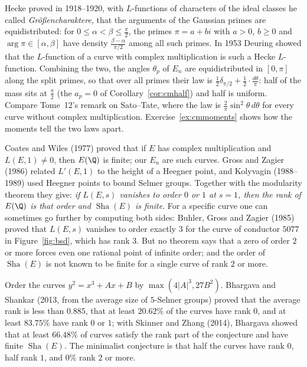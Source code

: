 \begin{remark}\label{rem:hecke}
Hecke proved in 1918--1920, with $L$-functions of characters of the ideal classes he called \emph{Gr\"o\ss encharaktere}, that the arguments of the Gaussian
primes are equidistributed: for $0\le\alpha<\beta\le\frac\pi2$, the primes $\pi=a+bi$ with $a>0$, $b\ge0$ and $\arg\pi\in[\alpha,\beta]$ have density
$\frac{\beta-\alpha}{\pi/2}$ among all such primes. In 1953 Deuring showed that the $L$-function of a curve with complex multiplication is such a Hecke
$L$-function. Combining the two, the angles $\theta_p$ of $E_n$ are equidistributed in $[0,\pi]$ along the split primes, so that over all primes their law is
$\frac12\delta_{\pi/2}+\frac12\cdot\frac{d\theta}\pi$: half of the mass sits at $\frac\pi2$ (the $a_p=0$ of Corollary~\ref{cor:cmhalf}) and half is uniform.
Compare Tome~12's remark on Sato--Tate, where the law is $\frac2\pi\sin^2\theta\,d\theta$ for every curve without complex multiplication.
Exercise~\ref{ex:cmmoments} shows how the moments tell the two laws apart.
\end{remark}

\begin{remark}\label{rem:bsdproved}
Coates and Wiles (1977) proved that if $E$ has complex multiplication and $L(E,1)\ne0$, then $E(\Q)$ is finite; our $E_n$ are such curves. Gross and Zagier
(1986) related $L'(E,1)$ to the height of a Heegner point, and Kolyvagin (1988--1989) used Heegner points to bound Selmer groups. Together with the modularity
theorem they give: \emph{if $L(E,s)$ vanishes to order $0$ or $1$ at $s=1$, then the rank of $E(\Q)$ is that order and $\operatorname{Sha}(E)$ is finite}. For a specific curve
one can sometimes go further by computing both sides: Buhler, Gross and Zagier (1985) proved that $L(E,s)$ vanishes to order exactly $3$ for the curve of
conductor $5077$ in Figure~\ref{fig:bsd}, which has rank $3$. But no theorem says that a zero of order $2$ or more forces even one rational point of
infinite order; and the order of $\operatorname{Sha}(E)$ is not known to be finite for a single curve of rank $2$ or more.
\end{remark}

\begin{remark}[on average]\label{rem:averages}
Order the curves $y^2=x^3+Ax+B$ by $\max(4|A|^3,27B^2)$. Bhargava and Shankar (2013, from the average size of $5$-Selmer groups) proved that the average rank
is less than $0.885$, that at least $20.62\%$ of the curves have rank $0$, and at least $83.75\%$ have rank $0$ or $1$; with Skinner and Zhang (2014), Bhargava
showed that at least $66.48\%$ of curves satisfy the rank part of the conjecture and have finite $\operatorname{Sha}(E)$. The minimalist conjecture is that half the curves have
rank $0$, half rank $1$, and $0\%$ rank $2$ or more.
\end{remark}

